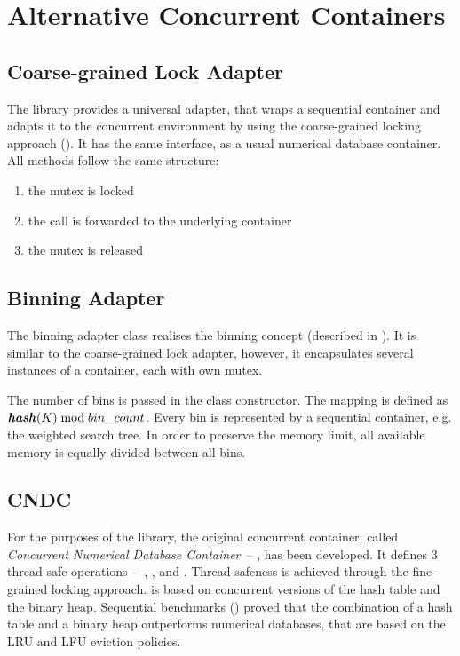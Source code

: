 \section{Alternative Concurrent Containers}
\label{sec:concurrent_containers}
\subsection{Coarse-grained Lock Adapter}
The \numdbname library provides a universal adapter, that wraps a sequential container and adapts it to the concurrent environment by using the coarse-grained locking approach (). It has the same interface, as a usual numerical database container. All methods follow the same structure:
\begin{enumerate}
\item the mutex is locked
\item the call is forwarded to the underlying container
\item the mutex is released
\end{enumerate}

\subsection{Binning Adapter}
The binning adapter class realises the binning concept (described in ). It is similar to the coarse-grained lock adapter, however, it encapsulates several instances of a container, each with own mutex.

The number of bins is passed in the class constructor. The mapping is defined as  $\textbf{\textit{hash}}(K)\bmod bin\_count$. Every bin is represented by a sequential container, e.g. the weighted search tree. In order to preserve the memory limit, all available memory is equally divided between all bins.

\subsection{CNDC}
\label{sec:cndc}
For the purposes of the \numdbname library, the original concurrent container, called \emph{Concurrent Numerical Database Container}~-- \cndcname, has been developed. It defines 3 thread-safe operations~-- \findop, \insertop, and . Thread-safeness is achieved through the fine-grained locking approach. \cndcname is based on concurrent versions of the hash table and the binary heap. Sequential benchmarks () proved that the combination of a hash table and a binary heap outperforms numerical databases, that are based on the LRU and LFU eviction policies.

